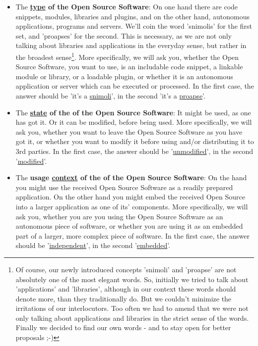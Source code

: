 \label{OsucTokens}
\begin{itemize}
  \item The \textbf{\underline{type} of the Open Source Software}: On one hand
  there are code snippets, modules, libraries and plugins, and on the other
  hand, autonomous applications, programs and servers. We’ll coin the word
  ’snimolis’ for the first set, and ’proapses’ for the second. This is
  necessary, as we are not only talking about libraries and applications in the
  everyday sense, but rather in the broadest sense\footnote{Of course, our newly
  introduced concepts 'snimoli' and 'proapse' are not absolutely one of the most
  elegant words. So, initially we tried to talk about 'applications' and
  'libraries', although in our context these words should denote more, than they
  traditionally do. But we couldn't minimize the irritations of our
  interlocutors. Too often we had to amend that we were not only talking about
  applications and libraries in the strict sense of the words. Finally we
  decided to find our own words - and to stay open for better proposals ;-) }.
  More specifically, we will ask you, whether the Open Source Software, you
  want to use, is an includable code snippet, a linkable module or library, or a
  loadable plugin, or whether it is an autonomous application or server which
  can be executed or processed. In the first case, the answer should be 'it's a
  \underline{snimoli}', in the second 'it's a \underline{proapse}'.

  \item The \textbf{\underline{state} of the of the Open Source Software}: It
  might be used, as one has got it. Or it can be modified, before being used.
  More specifically, we will ask you, whether you want to leave the Open Source
  Software as you have got it, or whether you want to modify it before using
  and/or distributing it to 3rd parties. In the first case, the answer should be
  '\underline{unmodified}', in the second '\underline{modified}'.
  
  \item The \textbf{usage \underline{context} of the of the Open Source
  Software}: On the hand you might use the received Open Source Software as a
  readily prepared application. On the other hand you might embed the received
  Open Source into a larger application as one of its' components. More
  specifically, we will ask you, whether you are you using the Open Source
  Software as an autonomous piece of software, or whether you are using it as an
  embedded part of a larger, more complex piece of software. In the first case,
  the answer should be '\underline{independent}', in the second
  '\underline{embedded}'.
  

\end{itemize}
